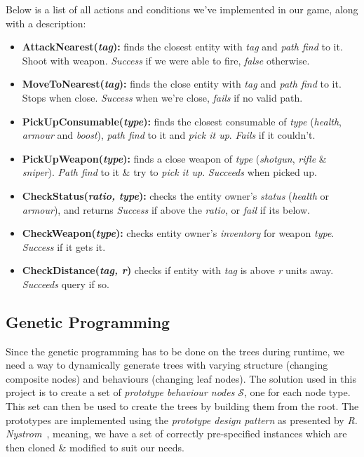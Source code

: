 \documentclass[a4paper, twocolumn]{article}
\begin{document}
        Below is a list of all actions and conditions we've implemented in our game, along with a description:

        \begin{itemize}
            \item{\textbf{AttackNearest(\emph{tag}):} finds the closest entity with \emph{tag} and \emph{path find} to it. Shoot with weapon. \emph{Success} if we were able to fire, \emph{false} otherwise.}
            \item{\textbf{MoveToNearest(\emph{tag}):} finds the close entity with \emph{tag} and \emph{path find} to it. Stops when close. \emph{Success} when we're close, \emph{fails} if no valid path.}
            \item{\textbf{PickUpConsumable(\emph{type}):} finds the closest consumable of \emph{type} (\emph{health}, \emph{armour} and \emph{boost}), \emph{path find} to it and \emph{pick it up}. \emph{Fails} if it couldn't.}
            \item{\textbf{PickUpWeapon(\emph{type}):} finds a close weapon of \emph{type} (\emph{shotgun}, \emph{rifle} \& \emph{sniper}). \emph{Path find} to it \& try to \emph{pick it up}. \emph{Succeeds} when picked up.}
        \end{itemize}
        \begin{itemize}
            \item{\textbf{CheckStatus(\emph{ratio, type}):} checks the entity owner's \emph{status} (\emph{health} or \emph{armour}), and returns \emph{Success} if above the \emph{ratio}, or \emph{fail} if its below.}
            \item{\textbf{CheckWeapon(\emph{type}):} checks entity owner's \emph{inventory} for weapon \emph{type}. \emph{Success} if it gets it.}
            \item{\textbf{CheckDistance(\emph{tag, r})} checks if entity with \emph{tag} is above \emph{r} units away. \emph{Succeeds} query if so.}
        \end{itemize}

        \clearpage

        \subsection{Genetic Programming} \label{sec:genetic_programming_implementation}

        Since the genetic programming has to be done on the trees during runtime, we need a way to dynamically generate trees with varying structure (changing composite nodes) and behaviours (changing leaf nodes). The solution used in this project is to create a set of \textit{prototype behaviour nodes} \(\mathcal{S}\), one for each node type. This set can then be used to create the trees by building them from the root. The prototypes are implemented using the \textit{prototype design pattern} as presented by \textit{R. Nystrom}~\cite{nystrom2014game}, meaning, we have a set of correctly pre-specified instances which are then cloned \& modified to suit our needs.
\end{document}
